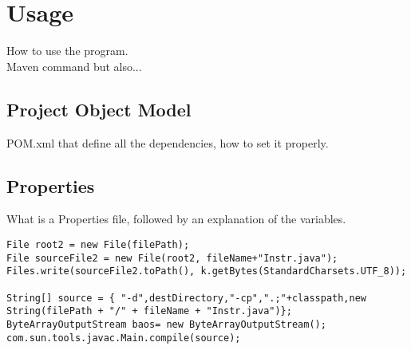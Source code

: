 \chapter{Usage}\label{ch:usage}
How to use the program.\\
Maven command but also...
\section{Project Object Model}\label{sec:pom}
POM.xml that define all the dependencies, how to set it properly.
\section{Properties}\label{sec:prop}
What is a Properties file, followed by an explanation of the variables.


\lstset{language=Java}          %
\begin{lstlisting}[caption={Testing how to print code!}]  % Start your code-block
File root2 = new File(filePath);
File sourceFile2 = new File(root2, fileName+"Instr.java");
Files.write(sourceFile2.toPath(), k.getBytes(StandardCharsets.UTF_8));

String[] source = { "-d",destDirectory,"-cp",".;"+classpath,new String(filePath + "/" + fileName + "Instr.java")};
ByteArrayOutputStream baos= new ByteArrayOutputStream();
com.sun.tools.javac.Main.compile(source);
\end{lstlisting}
\newpage